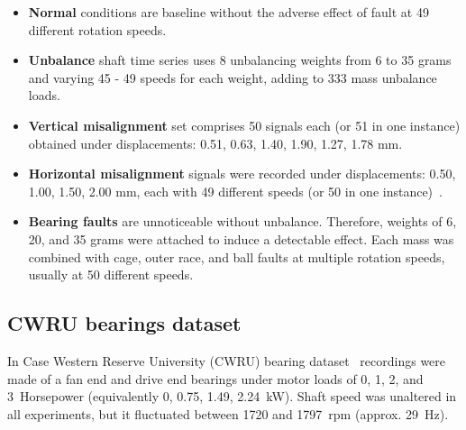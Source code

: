 \begin{itemize}
\itemsep0pt

\item \textbf{Normal} conditions are baseline without the adverse effect of fault at 49 different rotation speeds.

\item \textbf{Unbalance} shaft time series uses 8 unbalancing weights from 6 to 35 grams and varying 45 - 49 speeds for each weight, adding to 333 mass unbalance loads.

\item \textbf{Vertical misalignment} set comprises 50 signals each (or 51 in one instance) obtained under displacements: 0.51, 0.63, 1.40, 1.90, 1.27, 1.78 mm.

\item \textbf{Horizontal misalignment} signals were recorded under displacements: 0.50, 1.00, 1.50, 2.00 mm, each with 49 different speeds (or 50 in one instance)~\cite{pestana-viana_influence_2016}.

\item \textbf{Bearing faults} are unnoticeable without unbalance. Therefore, weights of 6, 20, and 35 grams were attached to induce a detectable effect. Each mass was combined with cage, outer race, and ball faults at multiple rotation speeds, usually at 50 different speeds.
\end{itemize}


\subsection{CWRU bearings dataset}
In Case Western Reserve University (CWRU) bearing dataset~\cite{cwru_dataset} recordings were made of a fan end and drive end bearings under motor loads of 0, 1, 2, and 3~Horsepower (equivalently 0, 0.75, 1.49, 2.24~kW). Shaft speed was unaltered in all experiments, but it fluctuated between 1720 and 1797~rpm (approx. 29~Hz).

